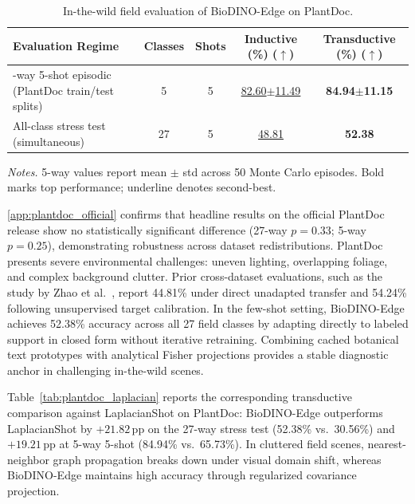 \begin{table}[htbp]
\caption{In-the-wild field evaluation of BioDINO-Edge on PlantDoc.}
\label{tab:plantdoc_context}
\centering
\footnotesize
\setlength{\tabcolsep}{4pt}
\begin{tabularx}{\columnwidth}{@{}>{\raggedright\arraybackslash}Xcccc@{}}
\toprule
\textbf{Evaluation Regime} & \textbf{Classes} & \textbf{Shots} & \textbf{Inductive (\%) ($\uparrow$)} & \textbf{Transductive (\%) ($\uparrow$)} \\
\midrule
5-way 5-shot episodic (PlantDoc train/test splits) & 5 & 5 & \underline{82.60$\pm$11.49} & \textbf{84.94$\pm$11.15} \\
All-class stress test (simultaneous) & 27 & 5 & \underline{48.81} & \textbf{52.38} \\
\bottomrule
\end{tabularx}

\vspace{3pt}
\begin{minipage}{\columnwidth}
\footnotesize
\textit{Notes.} 5-way values report mean $\pm$ std across 50 Monte Carlo episodes. Bold marks top performance; underline denotes second-best.
\end{minipage}
\end{table}

\ref{app:plantdoc_official} confirms that headline results on the official PlantDoc release show no statistically significant difference (27-way $p=0.33$; 5-way $p=0.25$), demonstrating robustness across dataset redistributions. PlantDoc presents severe environmental challenges: uneven lighting, overlapping foliage, and complex background clutter. Prior cross-dataset evaluations, such as the study by Zhao et al.~\cite{zhao2026lightweight}, report 44.81\% under direct unadapted transfer and 54.24\% following unsupervised target calibration. In the few-shot setting, BioDINO-Edge achieves 52.38\% accuracy across all 27 field classes by adapting directly to labeled support in closed form without iterative retraining. Combining cached botanical text prototypes with analytical Fisher projections provides a stable diagnostic anchor in challenging in-the-wild scenes.

Table~\ref{tab:plantdoc_laplacian} reports the corresponding transductive comparison against LaplacianShot on PlantDoc: BioDINO-Edge outperforms LaplacianShot by $+21.82$\,pp on the 27-way stress test (52.38\% vs.\ 30.56\%) and $+19.21$\,pp at 5-way 5-shot (84.94\% vs.\ 65.73\%). In cluttered field scenes, nearest-neighbor graph propagation breaks down under visual domain shift, whereas BioDINO-Edge maintains high accuracy through regularized covariance projection.

